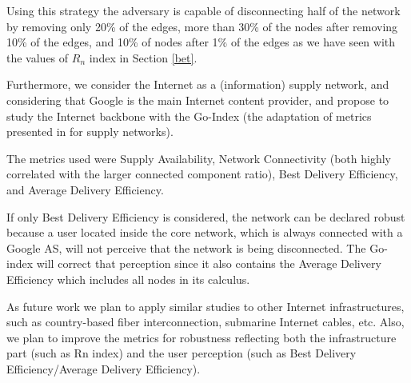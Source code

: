 \documentclass{sig-alternate-10pt}
\begin{document}
Using this strategy the adversary is capable of disconnecting half of the network by removing only 20\% of the edges, more than 30\% of the nodes after removing 10\% of the edges, and 10\% of nodes after 1\% of the edges as we have seen with the values of $R_{n}$ index in Section  \ref{bet}.

Furthermore, we consider the Internet as a (information) supply network,
and considering that Google is the main Internet content provider, 
and propose to study the Internet backbone with the Go-Index 
(the adaptation of metrics presented in \cite{zhao2011achieving}  for supply networks).

The metrics used were Supply Availability, Network Connectivity (both highly correlated with the larger connected component ratio), 
Best Delivery Efficiency, and Average Delivery Efficiency.

If only Best Delivery Efficiency is considered, the network can be declared robust 
because a user located inside the core network, which is always connected with a Google AS, 
will not perceive that the network is being disconnected. The Go-index will correct that perception since it also contains the Average Delivery Efficiency which includes all nodes in its calculus. 

As future work we plan to apply similar studies to other Internet infrastructures, 
such as country-based fiber interconnection, submarine Internet cables, etc. 
Also, we plan to improve the metrics for robustness reflecting both 
the infrastructure part (such as Rn index) and the user perception 
(such as Best Delivery Efficiency/Average Delivery Efficiency).
\end{document}
